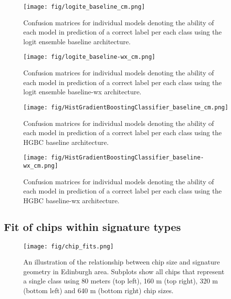 \begin{figure}
    \centering
    \texttt{[image: fig/logite\_baseline\_cm.png]}
    \caption{\footnotesize Confusion matrices for individual models denoting
    the ability of each model in prediction of a correct label per each class
    using the logit ensemble baseline architecture.}
    \label{fig:logite_baseline_cm}
\end{figure}


\begin{figure}
    \centering
    \texttt{[image: fig/logite\_baseline-wx\_cm.png]}
    \caption{\footnotesize Confusion matrices for individual models denoting
    the ability of each model in prediction of a correct label per each class
    using the logit ensemble baseline-wx architecture.}
    \label{fig:maxprob_cm}
\end{figure}


\begin{figure}
    \centering
    \texttt{[image: fig/HistGradientBoostingClassifier\_baseline\_cm.png]}
    \caption{\footnotesize Confusion matrices for individual models denoting
    the ability of each model in prediction of a correct label per each class
    using the HGBC baseline architecture.}
    \label{fig:HistGradientBoostingClassifier_baseline_cm}
\end{figure}



\begin{figure}
    \centering
    \texttt{[image: fig/HistGradientBoostingClassifier\_baseline-wx\_cm.png]}
    \caption{\footnotesize Confusion matrices for individual models denoting
    the ability of each model in prediction of a correct label per each class
    using the HGBC baseline-wx architecture.}
    \label{fig:HistGradientBoostingClassifier_baseline-wx}
\end{figure}


\subsection{Fit of chips within signature types}

\begin{figure}
    \centering
    \texttt{[image: fig/chip\_fits.png]}
    \caption{\footnotesize An illustration of the relationship between chip size and
    signature geometry in Edinburgh area. Subplots show all chips that represent a single
    class using 80 meters (top left), 160 m (top right), 320 m (bottom left) and 640 m (bottom right) chip sizes.}
    \label{fig:chip_fits}
\end{figure}

